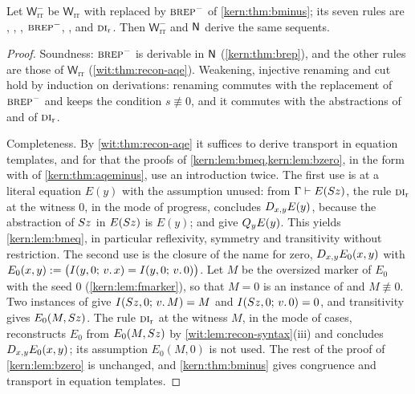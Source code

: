 \begin{theorem}
\label{wit:thm:matrix-free}
Let $\mathsf{W}^{-}_{\mathrm{rr}}$ be $\mathsf{W}_{\mathrm{rr}}$ with
 replaced by $\rulename{BRep}^{-}$ of \cref{kern:thm:bminus}; its
seven rules are , , ,
$\rulename{BRep}^{-}$, ,  and
$\rulename{DI}_{\mathrm r}$.  Then $\mathsf{W}^{-}_{\mathrm{rr}}$ and $\mathsf{N}$
derive the same sequents.
\end{theorem}

\begin{proof}
Soundness: $\rulename{BRep}^{-}$ is derivable in $\mathsf{N}$
(\cref{kern:thm:brep}), and the other rules are those of
$\mathsf{W}_{\mathrm{rr}}$ (\cref{wit:thm:recon-aqe}).  Weakening, injective
renaming and cut hold by induction on derivations: renaming commutes with the
replacement of $\rulename{BRep}^{-}$ and keeps the condition $s\not\equiv 0$,
and it commutes with the abstractions of  and of
$\rulename{DI}_{\mathrm r}$.

Completeness.  By \cref{wit:thm:recon-aqe} it suffices to derive transport in
equation templates, and for that the proofs of
\cref{kern:lem:bmeq,kern:lem:bzero}, in the form with  of
\cref{kern:thm:aqeminus}, use an introduction twice.  The first use is
 at a literal equation $E(y)$ with the assumption unused: from
$\Gamma\vdash E(S z)$, the rule $\rulename{DI}_{\mathrm r}$ at the witness
$0$, in the mode of progress, concludes $D_{x,y}E(y)$, because the
abstraction of $S z$ in $E(S z)$ is $E(y)$;  and
 give $Q_{y}E(y)$.  This yields \cref{kern:lem:bmeq}, in
particular reflexivity, symmetry and transitivity without restriction.  The
second use is the closure of the name for zero,
$D_{x,y}E_{0}(x,y)$ with
$E_{0}(x,y)\mathrel{:=}\bigl(I(y,0;\,v.\,x)=I(y,0;\,v.\,0)\bigr)$.  Let $M$ be the
oversized marker of $E_{0}$ with the seed $0$ (\cref{kern:lem:fmarker}), so
that $M=0$ is an instance of  and $M\not\equiv 0$.  Two instances
of  give $I(S z,0;\,v.\,M)=M$ and $I(S z,0;\,v.\,0)=0$,
and transitivity gives $E_{0}(M,S z)$.  The rule
$\rulename{DI}_{\mathrm r}$ at the witness $M$, in the mode of cases,
reconstructs $E_{0}$ from $E_{0}(M,S z)$ by
\cref{wit:lem:recon-syntax}(iii) and concludes $D_{x,y}E_{0}(x,y)$; its
assumption $E_{0}(M,0)$ is not used.  The rest of the proof of
\cref{kern:lem:bzero} is unchanged, and \cref{kern:thm:bminus} gives
congruence and transport in equation templates.
\end{proof}

